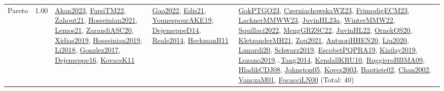 {\begin{longtable}{p{3cm}r>{\raggedright\arraybackslash}p{6cm}>{\raggedright\arraybackslash}p{6cm}>{\raggedright\arraybackslash}p{8cm}}
\index{Pareto}\index{Concepts!Pareto}Pareto &  1.00 & \hyperref[detail:Akan2023]{Akan2023}, \hyperref[detail:FarsiTM22]{FarsiTM22}, \hyperref[detail:Zahout21]{Zahout21}, \hyperref[detail:Hosseinian2021]{Hosseinian2021}, \hyperref[detail:Lemos21]{Lemos21}, \hyperref[detail:ZarandiASC20]{ZarandiASC20}, \hyperref[detail:Xidias2019]{Xidias2019}, \hyperref[detail:Hosseinian2019]{Hosseinian2019}, \hyperref[detail:Li2018]{Li2018}, \hyperref[detail:Gonzlez2017]{Gonzlez2017}, \hyperref[detail:Dejemeppe16]{Dejemeppe16}, \hyperref[detail:KovacsK11]{KovacsK11} & \hyperref[detail:Gao2022]{Gao2022}, \hyperref[detail:Edis21]{Edis21}, \hyperref[detail:YounespourAKE19]{YounespourAKE19}, \hyperref[detail:DejemeppeD14]{DejemeppeD14}, \hyperref[detail:Reale2014]{Reale2014}, \hyperref[detail:HeckmanB11]{HeckmanB11} & \hyperref[detail:GokPTGO23]{GokPTGO23}, \hyperref[detail:CzerniachowskaWZ23]{CzerniachowskaWZ23}, \hyperref[detail:FrimodigECM23]{FrimodigECM23}, \hyperref[detail:LacknerMMWW23]{LacknerMMWW23}, \hyperref[detail:JuvinHL23a]{JuvinHL23a}, \hyperref[detail:WinterMMW22]{WinterMMW22}, \hyperref[detail:Squillaci2022]{Squillaci2022}, \hyperref[detail:MengGRZSC22]{MengGRZSC22}, \hyperref[detail:JuvinHL22]{JuvinHL22}, \hyperref[detail:OrnekOS20]{OrnekOS20}, \hyperref[detail:KletzanderMH21]{KletzanderMH21}, \hyperref[detail:Zou2021]{Zou2021}, \hyperref[detail:AntuoriHHEN20]{AntuoriHHEN20}, \hyperref[detail:Liu2020]{Liu2020}, \hyperref[detail:Lunardi20]{Lunardi20}, \hyperref[detail:Schwarz2019]{Schwarz2019}, \hyperref[detail:EscobetPQPRA19]{EscobetPQPRA19}, \hyperref[detail:Kizilay2019]{Kizilay2019}, \hyperref[detail:Lozano2019]{Lozano2019}...\hyperref[detail:Tang2014]{Tang2014}, \hyperref[detail:KendallKRU10]{KendallKRU10}, \hyperref[detail:RuggieroBBMA09]{RuggieroBBMA09}, \hyperref[detail:HladikCDJ08]{HladikCDJ08}, \hyperref[detail:Johnston05]{Johnston05}, \hyperref[detail:Kovcs2003]{Kovcs2003}, \hyperref[detail:Baptiste02]{Baptiste02}, \hyperref[detail:Chan2002]{Chan2002}, \hyperref[detail:VanczaM01]{VanczaM01}, \hyperref[detail:FocacciLN00]{FocacciLN00} (Total: 40)\\

\end{longtable}}
